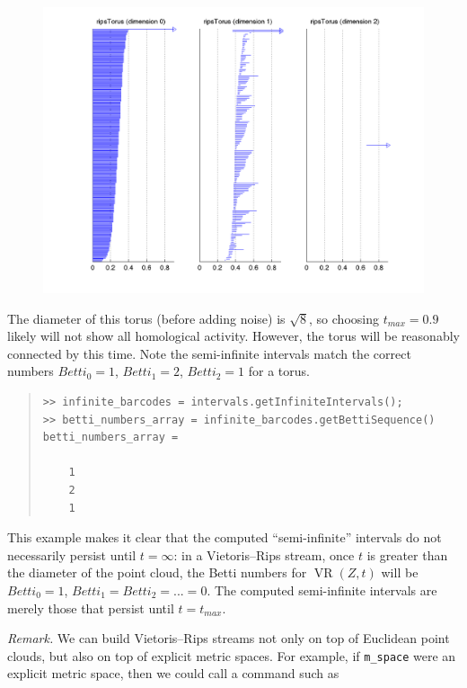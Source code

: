 \documentclass[amscd, amssymb, verbatim]{amsart}[12pt]
\theoremstyle{remark}
\theoremstyle{remark}
\theoremstyle{remark}
\DeclareMathOperator{\VR}{VR}
\begin{document}
\begin{figure}[htp]
	\begin{center}
    	\includegraphics[width=6in]{ripsTorus.png}
   	\end{center}
\end{figure}
\FloatBarrier

The diameter of this torus (before adding noise) is $\sqrt{8}$, so choosing $t_{max} = 0.9$ likely will not show all homological activity. However, the torus will be reasonably connected by this time. Note the semi-infinite intervals match the correct numbers $Betti_0 = 1$, $Betti_1 = 2$, $Betti_2 = 1$ for a torus.

\begin{quote} \begin{verbatim}
>> infinite_barcodes = intervals.getInfiniteIntervals();
>> betti_numbers_array = infinite_barcodes.getBettiSequence()
betti_numbers_array =

    1
    2
    1
\end{verbatim} \end{quote}

This example makes it clear that the computed ``semi-infinite'' intervals do not necessarily persist until $t = \infty$: in a Vietoris--Rips stream, once $t$ is greater than the diameter of the point cloud, the Betti numbers for $\VR(Z,t)$ will be $ Betti_0 = 1$, $Betti_1 = Betti_2 = ... = 0$. The computed semi-infinite intervals are merely those that persist until $t = t_{max}$. 

{\em Remark.} We can build Vietoris--Rips streams not only on top of Euclidean point clouds, but also on top of explicit metric spaces. For example, if \texttt{m\_space} were an explicit metric space, then we could call a command such as
\end{document}
